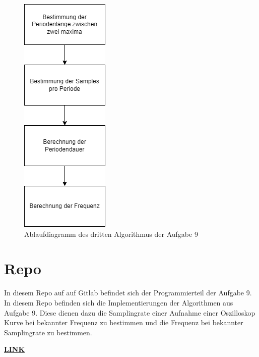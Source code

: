 \begin{figure}[h]
	\centering
	\includegraphics[scale=0.5]{Images/aufgabe9_algo3.png}
	\caption{Ablaufdiagramm des dritten Algorithmus der Aufgabe 9}
	\label{algo3}
\end{figure}

\section{Repo}
In diesem Repo auf auf Gitlab befindet sich der Programmierteil der Aufgabe 9.
In diesem Repo befinden sich die Implementierungen der Algorithmen aus Aufgabe 9.
Diese dienen dazu die Samplingrate einer Aufnahme einer Oszilloskop Kurve bei bekannter Frequenz zu bestimmen und die Frequenz bei bekannter Samplingrate zu bestimmen.\par

\href{https://gitlab.thga.de/daniel.krueger/pruefung_sose_2023_aufgabe_9_algorithmen}{\textbf{LINK}}
